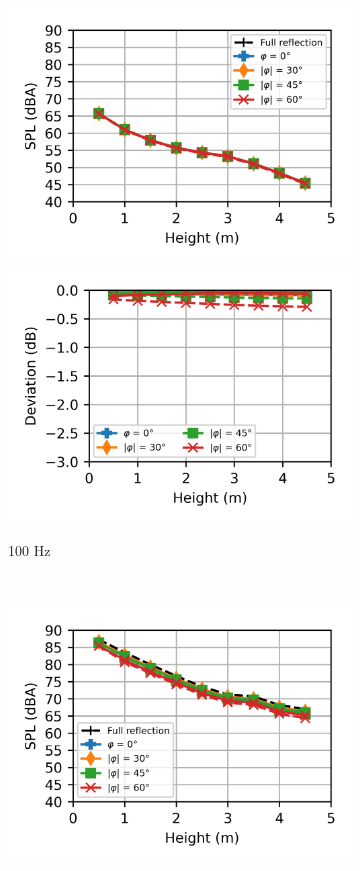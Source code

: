 \begin{figure}
	\centering
	\begin{subfigure}[b]{\textwidth}
		\centering
		\includegraphics{fig/chap5/impedance/third_octave/SPL_100_Hz.png}
		\hfill
		\includegraphics{fig/chap5/impedance/third_octave/deviation_100_Hz.png}
		\caption{100 Hz}
	\end{subfigure}
	\\
	\begin{subfigure}[b]{\textwidth}
		\centering
		\includegraphics{fig/chap5/impedance/third_octave/SPL_1000_Hz.png}

\end{subfigure}
\end{figure}
